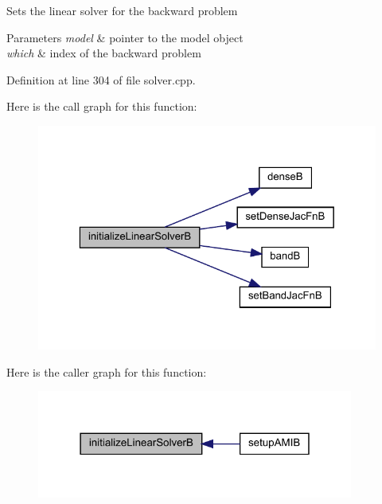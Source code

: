 Sets the linear solver for the backward problem


\begin{DoxyParams}{Parameters}
{\em model} & pointer to the model object \\
\hline
{\em which} & index of the backward problem \\
\hline
\end{DoxyParams}


Definition at line 304 of file solver.\+cpp.

Here is the call graph for this function\+:
\nopagebreak
\begin{figure}[H]
\begin{center}
\leavevmode
\includegraphics[width=323pt]{classamici_1_1_solver_a4f596731d15be6e9e76a2147aa1cce34_cgraph}
\end{center}
\end{figure}
Here is the caller graph for this function\+:
\nopagebreak
\begin{figure}[H]
\begin{center}
\leavevmode
\includegraphics[width=295pt]{classamici_1_1_solver_a4f596731d15be6e9e76a2147aa1cce34_icgraph}
\end{center}
\end{figure}
\mbox{\label{classamici_1_1_solver_a9a135f04f34dbf45cf980b97e6906665}} 

